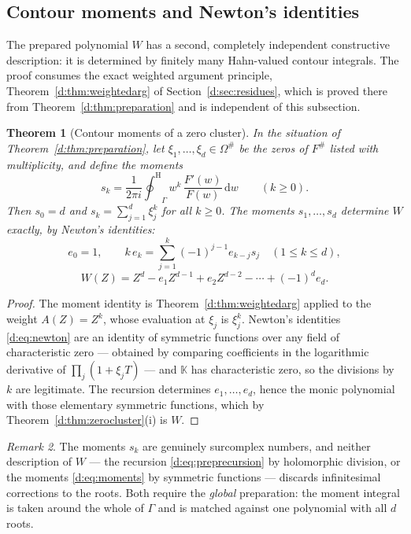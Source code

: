 \documentclass[11pt,a4paper]{article}
\numberwithin{equation}{section}
\newtheorem{theorem}{Theorem}[section]
\theoremstyle{definition}
\theoremstyle{remark}
\newtheorem{remark}[theorem]{Remark}
\theoremstyle{plain}
\newcommand{\K}{\mathbb K}
\newcommand{\halo}[1]{#1^{\#}}
\newcommand{\ev}[1]{#1^{\#}}
\newcommand{\ointH}{{\oint^{\mathrm H}}}
\newcommand{\dd}{\mathrm d}
\begin{document}
\subsection{Contour moments and Newton's identities}
\label{d:sub:moments}

The prepared polynomial $W$ has a second, completely independent
constructive description: it is determined by finitely many Hahn-valued
contour integrals.  The proof consumes the exact weighted argument
principle, Theorem~\ref{d:thm:weightedarg} of Section~\ref{d:sec:residues}, which is proved
there from Theorem~\ref{d:thm:preparation} and is independent of this
subsection.

\begin{theorem}[Contour moments of a zero cluster]
\label{d:thm:moments}
In the situation of Theorem~\ref{d:thm:preparation}, let
$\xi_1,\dots,\xi_d\in\halo\Omega$ be the zeros of $\ev F$ listed with
multiplicity, and define the moments
\begin{equation}\label{d:eq:moments}
 s_k=\frac1{2\pi i}\ointH_{\Gamma}w^{k}\,
      \frac{F'(w)}{F(w)}\,\dd w\qquad(k\ge0).
\end{equation}
Then $s_0=d$ and $s_k=\sum_{j=1}^{d}\xi_j^{k}$ for all $k\ge0$.  The
moments $s_1,\dots,s_d$ determine $W$ exactly, by Newton's identities:
\begin{equation}\label{d:eq:newton}
 e_0=1,\qquad k\,e_k=\sum_{j=1}^{k}(-1)^{j-1}e_{k-j}s_j
 \quad(1\le k\le d),
\end{equation}
\[
 W(Z)=Z^{d}-e_1Z^{d-1}+e_2Z^{d-2}-\cdots+(-1)^{d}e_d .
\]
\end{theorem}

\begin{proof}
The moment identity is Theorem~\ref{d:thm:weightedarg} applied to the
weight $A(Z)=Z^{k}$, whose evaluation at $\xi_j$ is $\xi_j^{k}$.
Newton's identities \eqref{d:eq:newton} are an identity of symmetric
functions over any field of characteristic zero --- obtained by
comparing coefficients in the logarithmic derivative of
$\prod_j(1+\xi_jT)$ --- and $\K$ has characteristic zero, so the
divisions by $k$ are legitimate.  The recursion determines
$e_1,\dots,e_d$, hence the monic polynomial with those elementary
symmetric functions, which by Theorem~\ref{d:thm:zerocluster}(i) is
$W$.
\end{proof}

\begin{remark}
The moments $s_k$ are genuinely surcomplex numbers, and neither
description of $W$ --- the recursion \eqref{d:eq:preprecursion} by
holomorphic division, or the moments \eqref{d:eq:moments} by symmetric
functions --- discards infinitesimal corrections to the roots.  Both
require the \emph{global} preparation: the moment integral is taken
around the whole of $\Gamma$ and is matched against one polynomial with
all $d$ roots.
\end{remark}
\end{document}

